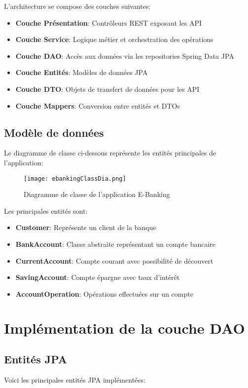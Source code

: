 \documentclass[12pt,a4paper]{report}
\begin{document}
L'architecture se compose des couches suivantes:
\begin{itemize}
    \item \textbf{Couche Présentation}: Contrôleurs REST exposant les API
    \item \textbf{Couche Service}: Logique métier et orchestration des opérations
    \item \textbf{Couche DAO}: Accès aux données via les repositories Spring Data JPA
    \item \textbf{Couche Entités}: Modèles de données JPA
    \item \textbf{Couche DTO}: Objets de transfert de données pour les API
    \item \textbf{Couche Mappers}: Conversion entre entités et DTOs
\end{itemize}

\section{Modèle de données}
Le diagramme de classe ci-dessous représente les entités principales de l'application:

\begin{figure}[H]
    \centering
    \texttt{[image: ebankingClassDia.png]}
    \caption{Diagramme de classe de l'application E-Banking}
    \label{fig:class-diagram}
\end{figure}

Les principales entités sont:
\begin{itemize}
    \item \textbf{Customer}: Représente un client de la banque
    \item \textbf{BankAccount}: Classe abstraite représentant un compte bancaire
    \item \textbf{CurrentAccount}: Compte courant avec possibilité de découvert
    \item \textbf{SavingAccount}: Compte épargne avec taux d'intérêt
    \item \textbf{AccountOperation}: Opérations effectuées sur un compte
\end{itemize}

\chapter{Implémentation de la couche DAO}
\section{Entités JPA}
Voici les principales entités JPA implémentées:
\end{document}

